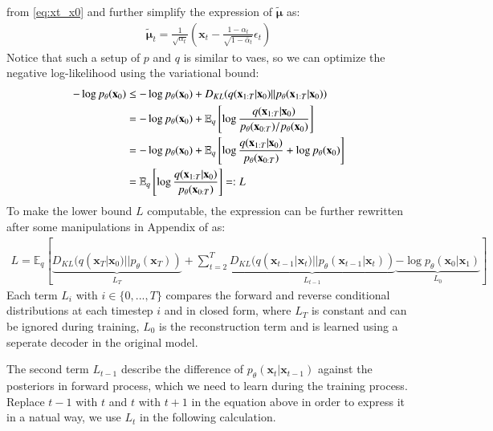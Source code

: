 \documentclass[12pt,DIV14,BCOR12mm,a4paper,footinclude=false,headinclude,parskip=half-,twoside,openright,cleardoublepage=empty,toc=index,bibliography=totoc,listof=totoc]{scrreprt}
\numberwithin{equation}{chapter}
\begin{document}
from \ref{eq:xt_x0} and further simplify the expression of $\boldsymbol{\tilde{\mu}}$ as:
\begin{align}\label{eq:mu_tilde}
  \boldsymbol{\tilde{\mu}}_{t} = \frac{1}{\sqrt{\alpha_{t}}}\left(\mathbf{x}_{t} - \frac{1-\alpha_{t}}{\sqrt{1-\bar{\alpha}_{t}}}\epsilon_{t}\right)
\end{align}
Notice that such a setup of $p$ and $q$ is similar to \glspl{vae}, so we can optimize the negative log-likelihood using the variational bound:
\begin{align}
  -\log p_{\theta}(\mathbf{x}_{0}) &\leq -\log p_{\theta}(\mathbf{x}_{0}) + D_{KL}(q(\mathbf{x}_{1:T}|\mathbf{x}_{0})||p_{\theta}(\mathbf{x}_{1:T}|\mathbf{x}_{0}))\notag\\
                                   &= -\log p_{\theta}(\mathbf{x}_{0}) + \mathbb{E}_{q}\left[\log\frac{q(\mathbf{x}_{1:T}|\mathbf{x}_{0})}{p_{\theta}(\mathbf{x}_{0:T})/p_{\theta}(\mathbf{x}_{0})}\right]\notag\\       
                                   &= -\log p_{\theta}(\mathbf{x}_{0}) + \mathbb{E}_{q}\left[\log\frac{q(\mathbf{x}_{1:T}|\mathbf{x}_{0})}{p_{\theta}(\mathbf{x}_{0:T})} + \log p_{\theta}(\mathbf{x}_{0})\right]\notag\\
                                   &= \mathbb{E}_{q}\left[\log\frac{q(\mathbf{x}_{1:T}|\mathbf{x}_{0})}{p_{\theta}(\mathbf{x}_{0:T})}\right] =: L             
\end{align}
To make the lower bound $L$ computable, the expression can be further rewritten after some manipulations in Appendix of \cite{ho2020denoising} as:
\begin{align}
  L = \mathbb{E}_{q}\left[\underbrace{D_{KL}(q(\mathbf{x}_{T}|\mathbf{x}_{0})||p_{\theta}(\mathbf{x}_{T}))}_{L_{T}} + \sum_{t=2}^{T}\underbrace{D_{KL}(q(\mathbf{x}_{t-1}|\mathbf{x}_{t})||p_{\theta}(\mathbf{x}_{t-1}|\mathbf{x}_{t}))}_{L_{t-1}} \underbrace{- \log p_{\theta}(\mathbf{x}_{0}|\mathbf{x}_{1})}_{L_{0}}\right]
\end{align}
Each term $L_{i}$ with $i\in \{0,...,T\}$ compares the forward and reverse conditional distributions at each timestep $i$ and in closed form, where $L_{T}$ is constant and can be ignored during training, $L_{0}$ is the reconstruction term and is learned using a seperate decoder in the original model\cite{weng2021diffusion}.

The second term $L_{t-1}$ describe the difference of $p_{\theta}(\mathbf{x}_{t}|\mathbf{x}_{t-1})$ against the posteriors in forward process, which we need to learn during the training process. Replace $t-1$ with $t$ and $t$ with $t+1$ in the equation above in order to express it in a natual way, we use $L_{t}$ in the following calculation.
\end{document}
